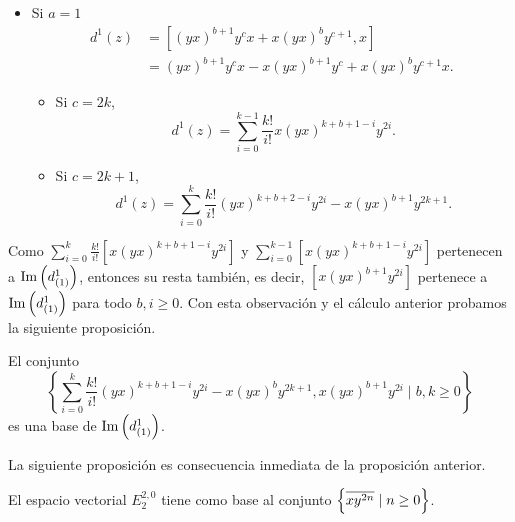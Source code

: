 \documentclass[fleqn,../tesis.tex]{subfiles}
\begin{document}
\begin{itemize}
\begin{itemize}
\begin{itemize}
        \end{itemize}
    \end{itemize}
    \item Si $a = 1$
       \begin{align*}
           d^1(z) &= \left[(yx)^{b + 1}y^cx  + x(yx)^{b}y^{c + 1}, x\right]\\
           &= (yx)^{b + 1}y^{c}x - x(yx)^{b + 1}y^{c} + x(yx)^b y^{c + 1}x.
       \end{align*}
    \begin{itemize}
        \item Si $c = 2k$,
        \[
             d^1(z) = \sum_{i = 0}^{k - 1}\frac{k!}{i!} x(yx)^{k + b + 1 -i}y^{2i}.           
        \]
        \item Si $c = 2k + 1$,
        \[
            d^1(z) = \sum_{i = 0}^{k}\frac{k!}{i!} (yx)^{k  + b + 2 -i}y^{2i} - x(yx)^{b + 1}y^{2k + 1}.
        \]
    \end{itemize}
\end{itemize}
Como $\sum_{i = 0}^{k}\frac{k!}{i!}\left[x(yx)^{k +  b + 1 - i}y^{2i}\right]$ y $\sum_{i = 0}^{k - 1}\left[x(yx)^{k + b + 1 -i}y^{2i}\right]$
pertenecen a $\operatorname{Im}\left(d^{1}_{(1)}\right)$, entonces su resta también, es decir, $\left[x(yx)^{b + 1}y^{2i}\right]$ pertenece a $\operatorname{Im}\left(d^{1}_{(1)}\right)$
para todo $b, i \geq 0$. Con esta observación y el cálculo anterior probamos la siguiente proposición.
\begin{prop}
    El conjunto
    \[
        \left\lbrace \sum_{i = 0}^{k}\frac{k!}{i!}(yx)^{k + b + 1 - i}y^{2i} - x(yx)^{b}y^{2k + 1},
            x(yx)^{b + 1}y^{2i} \mid b, k \geq 0 \right\rbrace
    \]
    es una base de $\operatorname{Im}\left(d^{1}_{(1)}\right)$.
\end{prop}

La siguiente proposición es consecuencia inmediata de la proposición anterior.
\begin{prop}
    El espacio vectorial $E^{2, 0}_{2}$ tiene como base al conjunto $\left\lbrace \overline{xy^{2n}} \mid n \geq 0\right\rbrace$.
\end{prop}
\end{document}
